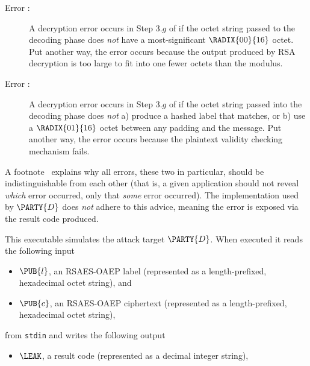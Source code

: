 \documentclass[crop={false},multi={true},tikz={true}]{standalone}
\begin{document}
\begin{description}
\item[Error :]
     A decryption error occurs in Step $3.g$ of  
     if the octet string passed to the decoding phase
     does {\em not} have a most-significant $\RADIX{00}{16}$ octet.
     Put another way, the error occurs because 
     the output produced by RSA decryption is too large to fit into one 
     fewer octets than the modulus.

\item[Error :]
     A decryption error occurs in Step $3.g$ of  
     if the octet string passed into the decoding phase 
     does {\em not} a) produce a hashed label that matches, or b) use a
     $\RADIX{01}{16}$ octet between any padding and the message.
     Put another way, the error occurs because 
     the plaintext validity checking mechanism fails.
\end{description}

\noindent
A footnote~\cite[Section 7.1.2]{SCALE:RFC:3447} explains why all errors, 
these two in particular, should be indistinguishable from each other (that
is, a given application should not reveal {\em which} error occurred, only 
that {\em some} error occurred).  The implementation used by $\PARTY{D}$ 
does {\em not} adhere to this advice, meaning the error is exposed via 
the result code produced.



This executable simulates the attack target $\PARTY{D}$.  When executed it 
reads the following input

\begin{itemize}
\item $\PUB{l}$,
      an RSAES-OAEP label
      (represented as a  length-prefixed, hexadecimal octet   string),
      and
\item $\PUB{c}$,
      an RSAES-OAEP ciphertext
      (represented as a  length-prefixed, hexadecimal octet   string),
\end{itemize}

\noindent
from \lstinline[language={bash}]{stdin} and writes the following output

\begin{itemize}
\item $\LEAK$,
      a  result code
      (represented as a                       decimal integer string),
\end{itemize}
\end{document}
